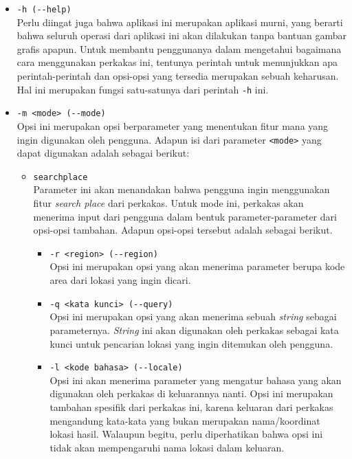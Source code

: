 \begin{itemize}
	\item \verb|-h (--help)|\\
	Perlu diingat juga bahwa aplikasi ini merupakan aplikasi \cl murni, yang berarti bahwa seluruh operasi dari aplikasi ini akan dilakukan tanpa bantuan gambar grafis apapun. Untuk membantu penggunanya dalam mengetahui bagaimana cara menggunakan perkakas ini, tentunya perintah untuk menunjukkan apa perintah-perintah dan opsi-opsi yang tersedia merupakan sebuah keharusan. Hal ini merupakan fungsi satu-satunya dari perintah \verb|-h| ini.
	
	\item \verb|-m <mode> (--mode)|\\
	Opsi ini merupakan opsi berparameter yang menentukan fitur mana yang ingin digunakan oleh pengguna. Adapun isi dari parameter \verb|<mode>| yang dapat digunakan adalah sebagai berikut:
	
	\begin{itemize}	
		\item \verb|searchplace|\\
		Parameter ini akan menandakan bahwa pengguna ingin menggunakan fitur \textit{search place} dari perkakas. Untuk mode ini, perkakas akan menerima input dari pengguna dalam bentuk parameter-parameter dari opsi-opsi tambahan. Adapun opsi-opsi tersebut adalah sebagai berikut.
			
		\begin{itemize}
			\item \verb|-r <region> (--region)|\\
			Opsi ini merupakan opsi yang akan menerima parameter berupa kode area dari lokasi yang ingin dicari.
			\item \verb|-q <kata kunci> (--query)|\\
			Opsi ini merupakan opsi yang akan menerima sebuah \textit{string} sebagai parameternya. \textit{String} ini akan digunakan oleh perkakas sebagai kata kunci untuk pencarian lokasi yang ingin ditemukan oleh pengguna.
			\item \verb|-l <kode bahasa> (--locale)|\\
			Opsi ini akan menerima parameter yang mengatur bahasa yang akan digunakan oleh perkakas di keluarannya nanti. Opsi ini merupakan tambahan spesifik dari perkakas ini, karena keluaran dari perkakas mengandung kata-kata yang bukan merupakan nama/koordinat lokasi hasil. Walaupun begitu, perlu diperhatikan bahwa opsi ini tidak akan mempengaruhi nama lokasi dalam keluaran.
		\end{itemize}
	

\end{itemize}
\end{itemize}
